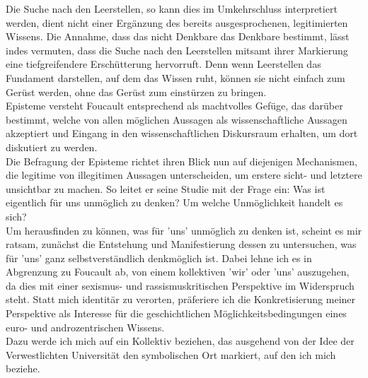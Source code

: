 \noindent Die Suche nach den
Leerstellen, so kann dies im Umkehrschluss interpretiert werden, dient nicht
einer Ergänzung des bereits ausgesprochenen, legitimierten Wissens. Die Annahme,
dass das nicht Denkbare das Denkbare bestimmt, lässt indes vermuten, dass die
Suche nach den Leerstellen mitsamt ihrer Markierung eine tiefgreifendere
Erschütterung hervorruft. Denn wenn Leerstellen das Fundament darstellen, auf
dem das Wissen ruht, können sie nicht einfach zum Gerüst werden, ohne das Gerüst
zum einstürzen zu bringen.\\
Episteme versteht Foucault entsprechend als machtvolles Gefüge, das darüber
bestimmt, welche von allen möglichen Aussagen als wissenschaftliche Aussagen
akzeptiert und Eingang in den wissenschaftlichen Diskursraum erhalten, um dort
diskutiert zu werden.\footnotemark {}\\
Die Befragung der Episteme richtet ihren Blick nun auf diejenigen Mechanismen,
die legitime von illegitimen Aussagen unterscheiden, um erstere sicht- und
letztere unsichtbar zu machen. So leitet er seine Studie mit der Frage ein:
\glqq Was ist eigentlich für uns unmöglich zu denken? Um welche Unmöglichkeit
handelt es sich?\grqq \footnotemark {}\\

\noindent Um herausfinden zu können, was für 'uns' unmöglich zu denken ist, scheint es mir
ratsam, zunächst die Entstehung und Manifestierung dessen zu untersuchen, was
für 'uns' ganz selbstverständlich denkmöglich ist. Dabei lehne ich es in
Abgrenzung zu Foucault ab, von einem kollektiven 'wir' oder 'uns' auszugehen, da
dies mit einer sexismus- und rassismuskritischen Perspektive im Widerspruch
steht. Statt mich identitär zu verorten, präferiere ich die Konkretisierung
meiner Perspektive als Interesse für die geschichtlichen Möglichkeitsbedingungen
eines euro- und androzentrischen Wissens. \\
Dazu werde ich mich auf ein Kollektiv
beziehen, das ausgehend von der Idee der \glqq Verwestlichten Universität\grqq 
\footnotemark {} den 
symbolischen Ort markiert, auf den ich mich beziehe.\\

